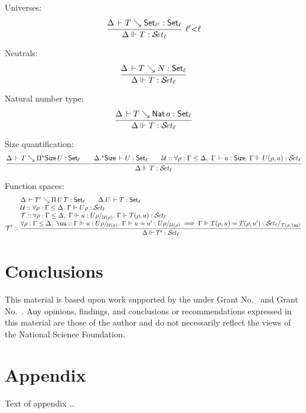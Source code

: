 \documentclass[acmlarge,review,anonymous]{acmart}\settopmatter{printfolios=true}
\begin{document}
\begin{caselist}

\nextcase Universes:
\[
  \rux{\Delta \der T \evalsto \Set[\ell'] : \Set[\ell]
     }{\sty \Delta T \ell
     }{\ell' {<} \ell}
\]


\nextcase Neutrals:
\[
  \ru{\Delta \der T \evalsto N : \Set[\ell]
    }{\sty \Delta T \ell}
\]

\nextcase Natural number type:
\[
  \ru{\Delta \der T \evalsto \Nat a : \Set[\ell]
    }{\sty \Delta T \ell}
\]

\nextcase Size quantification:
\[
  \rul{\Delta \der T \evalsto \epiT \Size U : \Set[\ell] \qquad
       \eext \Delta \Size \der U : \Set[\ell] \qquad
      \U :: \forall \rho : \Gamma \leq \Delta,~\Gamma \der a : \Size.~
        \sty \Gamma {U(\rho,a)} \ell \\
    }{\sty \Delta {T} \ell}
\]

\nextcase Function spaces:
\[
  \T' ::
  \rul{\Delta \der T' \evalsto \piT {U} {T} : \Set[\ell] \qquad \cext \Delta U \der T : \Set[\ell] \\ \relax
      \U :: \forall \rho : \Gamma \leq \Delta.~ \sty{\Gamma}{U\rho} {\ell} \\ \relax
      \T :: \forall \rho : \Gamma \leq \Delta,~\sttmd \Gamma u {U\rho} {\U(\rho)}.~
        \sty \Gamma {T(\rho,u)} \ell \\
      \forall \rho : \Gamma \leq \Delta,~ \uu :: \sttmd \Gamma u {U\rho} {\U(\rho)}.~
        \sttmeqd \Gamma u {u'} {U\rho} {\U(\rho)} {\uu} \implies
        \steqd \Gamma {T(\rho,u)} {T(\rho,u')} \ell {\T(\rho,\uu)}
    }{\sty \Delta {T'} \ell}
\]

\end{caselist}

\section{Conclusions}
\label{sec:concl}

\begin{acks}                            %
  This material is based upon work supported by the
   under Grant
  No.~ and Grant
  No.~.  Any opinions, findings, and
  conclusions or recommendations expressed in this material are those
  of the author and do not necessarily reflect the views of the
  National Science Foundation.
\end{acks}





\appendix
\section{Appendix}

Text of appendix \ldots
\end{document}

